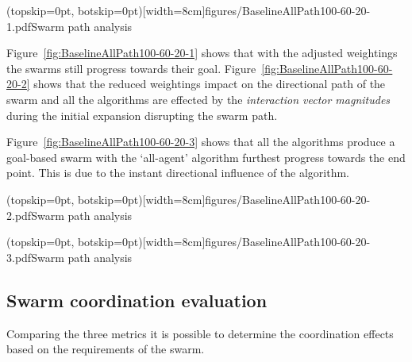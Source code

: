 \documentclass{ieeeaccess}
\begin{document}

\Figure[t!](topskip=0pt, botskip=0pt)[width=8cm]{figures/BaselineAllPath100-60-20-1.pdf}{Swarm path analysis\label{fig:BaselineAllPath100-60-20-1}}

Figure~\ref{fig:BaselineAllPath100-60-20-1} shows that with the adjusted weightings the swarms still progress towards their goal. Figure~\ref{fig:BaselineAllPath100-60-20-2} shows that the reduced weightings impact on the directional path of the swarm and all the algorithms are effected by the \textit{interaction vector magnitudes} during the initial expansion disrupting the swarm path.

Figure~\ref{fig:BaselineAllPath100-60-20-3} shows that all the algorithms produce a goal-based swarm with the `all-agent' algorithm furthest progress towards the end point. This is due to the instant directional influence of the algorithm. 


\Figure[t!](topskip=0pt, botskip=0pt)[width=8cm]{figures/BaselineAllPath100-60-20-2.pdf}{Swarm path analysis\label{fig:BaselineAllPath100-60-20-2}}


\Figure[t!](topskip=0pt, botskip=0pt)[width=8cm]{figures/BaselineAllPath100-60-20-3.pdf}{Swarm path analysis\label{fig:BaselineAllPath100-60-20-3}}

\subsection{Swarm coordination evaluation\label{reduced:coordinationEvaluation}}
Comparing the three metrics it is possible to determine the coordination effects based on the requirements of the swarm.
\end{document}
